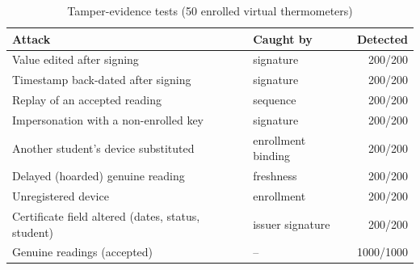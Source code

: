 \begin{table}[t]\centering\caption{Tamper-evidence tests (50 enrolled virtual thermometers)}\label{tab:tamper}\footnotesize\setlength{\tabcolsep}{3pt}
\begin{tabular}{p{4.1cm}p{2.0cm}r}\hline
Attack & Caught by & Detected \\\hline
Value edited after signing & signature & 200/200 \\
Timestamp back-dated after signing & signature & 200/200 \\
Replay of an accepted reading & sequence & 200/200 \\
Impersonation with a non-enrolled key & signature & 200/200 \\
Another student's device substituted & enrollment binding & 200/200 \\
Delayed (hoarded) genuine reading & freshness & 200/200 \\
Unregistered device & enrollment & 200/200 \\
Certificate field altered (dates, status, student) & issuer signature & 200/200 \\
\hline Genuine readings (accepted) & -- & 1000/1000 \\
\hline\end{tabular}\end{table}
